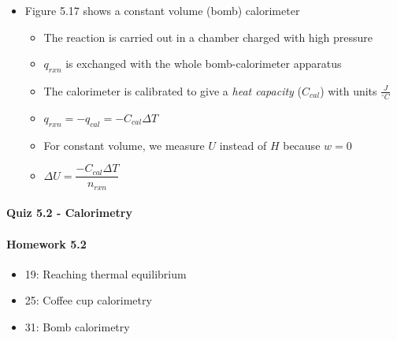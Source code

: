 \documentclass[12pt, openany, letterpaper]{memoir}
\begin{document}
\begin{itemize}
\begin{itemize}
    \end{itemize}
  \item Figure 5.17 shows a constant volume (bomb) calorimeter
    \begin{itemize}
      \item The reaction is carried out in a chamber charged with high pressure 
      \item $q_{rxn}$ is exchanged with the whole bomb-calorimeter apparatus
      \item The calorimeter is calibrated to give a \emph{heat capacity} ($C_{cal}$) with units $\frac{J}{^\circ C}$
      \item $q_{rxn}=-q_{cal}=-C_{cal}\Delta T$
      \item For constant volume, we measure $U$ instead of $H$ because $w=0$
      \item $\Delta U = \dfrac{-C_{cal}\Delta T}{n_{rxn}}$
    \end{itemize}
\end{itemize}

\paragraph*{Quiz 5.2 - Calorimetry}
\paragraph*{Homework 5.2}
\begin{itemize}
  \item 19: Reaching thermal equilibrium 
  \item 25: Coffee cup calorimetry
  \item 31: Bomb calorimetry
\end{itemize}
\end{document}
